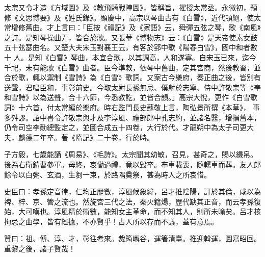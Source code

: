 \begin{pinyinscope}
 太宗又令才造《方域圖》及《教飛騎戰陣圖》，皆稱旨，擢授太常丞。永徽初，預修《文思博要》及《姓氏錄》。顯慶中，高宗以琴曲古有《白雪》，近代頓絕，使太常增修舊曲。才上言曰：「臣按《禮記》及《家語》云，舜彈五弦之琴，歌《南風》之詩。是知琴操曲弄，皆合於歌。又張華《博物志》云：《白雪》是天帝使素女鼓五十弦瑟曲名。又楚大夫宋玉對襄王云，有客於郢中歌《陽春白雪》，國中和者數十
 人。是知《白雪》琴曲，本宜合歌，以其調高，人和遂寡。自宋玉已來，迄今千祀，未有能歌《白雪》曲者。臣今準敕，依琴中舊曲，定其宮商，然後教習，並合於歌，輒以禦制《雪詩》為《白雪》歌詞。又案古今樂府，奏正曲之後，皆別有送聲，君唱臣和，事彰前史。今取太尉長孫無忌、僕射於志寧、侍中許敬宗等《奉和雪詩》以為送聲，合十六節，今悉教訖，並皆合韻。」高宗大悅，更作《白雪歌詞》十六首，付太常編於樂府。時右監門長史蘇敬上言，陶弘景所撰《本草》，
 事多舛謬。詔中書令許敬宗與才及李淳風、禮部郎中孔志約，並諸名醫，增損舊本，仍令司空李勣總監定之，並圖合成五十四卷，大行於代。才龍朔中為太子司更大夫，麟德二年卒。著《隋記》二十卷，行於時。



 子方毅，七歲能誦《周易》、《毛詩》。太宗聞其幼敏，召見，甚奇之，賜以縑帛。後為右衛鎧曹參軍。母終，哀慟過禮，竟以毀卒。布車載喪，隨轜車而葬。友人郎餘令以白粥、玄酒，生芻一束，於路隅奠祭，甚為時人之所哀惜。



 史臣曰：孝孫定音律，仁均正歷數，淳風候象緯，呂才推陰陽，訂於其倫，咸以為裨、梓、京、管之流也。然旋宮三代之法，秦火籍煬，歷代缺其正音，而云孝孫復始，大可嘆也。淳風精於術數，能知女主革命，而不知其人，則所未喻矣。呂才核拘忌之曲學，皆有經據，不亦賢乎！古人所以存而不議，蓋有意焉。



 贊曰：祖、傅、淳、才，彰往考來。裁筠嶰谷，運箸清臺。推迎斡運，圖寫昭回。重黎之後，諸子賢哉！



\end{pinyinscope}